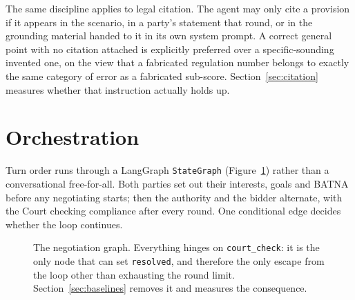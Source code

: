 The same discipline applies to legal citation. The agent may only cite a
provision if it appears in the scenario, in a party's statement that round, or in
the grounding material handed to it in its own system prompt. A correct general
point with no citation attached is explicitly preferred over a specific-sounding
invented one, on the view that a fabricated regulation number belongs to exactly
the same category of error as a fabricated sub-score. Section~\ref{sec:citation}
measures whether that instruction actually holds up.

\section{Orchestration}
\label{sec:orchestration}

Turn order runs through a LangGraph \texttt{StateGraph} (Figure~\ref{fig:graph})
rather than a conversational free-for-all. Both parties set out their interests,
goals and BATNA before any negotiating starts; then the authority and the bidder
alternate, with the Court checking compliance after every round. One conditional
edge decides whether the loop continues.

\begin{figure}[htbp]
\centering
{}
\caption[Negotiation state graph]{The negotiation graph. Everything hinges on
\texttt{court\_check}: it is the only node that can set \texttt{resolved}, and
therefore the only escape from the loop other than exhausting the round limit.
Section~\ref{sec:baselines} removes it and measures the consequence.}
\label{fig:graph}
\end{figure}

